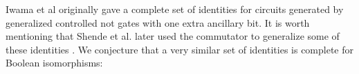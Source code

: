 %
%






Iwama et al \cite{iwama} originally gave a complete set of identities for circuits generated by generalized controlled not gates with one extra ancillary bit.  It is worth mentioning that Shende et al. later used the commutator to generalize some of these identities \cite[Corollary 26]{shende}.  We conjecture that a very similar set of identities is complete for Boolean isomorphisms: 



